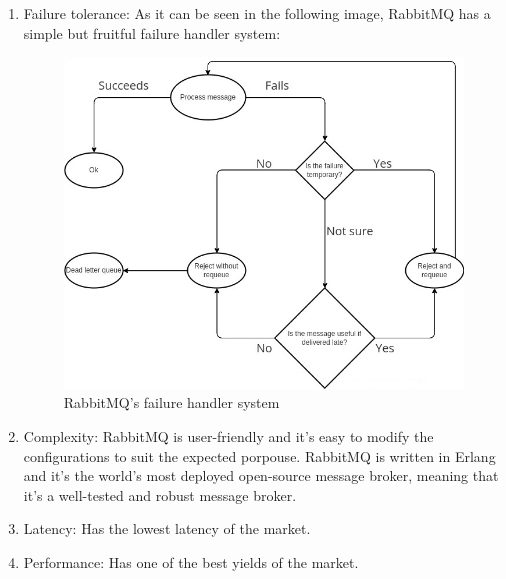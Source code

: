 \documentclass[12pt]{article}
\begin{document}
\begin{enumerate}
    \item Failure tolerance: As it can be seen in the following image, RabbitMQ has a simple but fruitful failure handler system:
    \begin{figure}[H]
        \centering
        \includegraphics[scale = 2]{Images/fault handling process.jpg}
        \caption{RabbitMQ's failure handler system}
        \label{fig:failure}
    \end{figure}
    \item Complexity: RabbitMQ is user-friendly and it's easy to modify the configurations to suit the expected porpouse. RabbitMQ is written in Erlang and it's the world's most deployed open-source message broker, meaning that it's a well-tested and robust message broker.
    \item Latency: Has the lowest latency of the market.
    \item Performance: Has one of the best yields of the market.
\end{enumerate}
\end{document}
